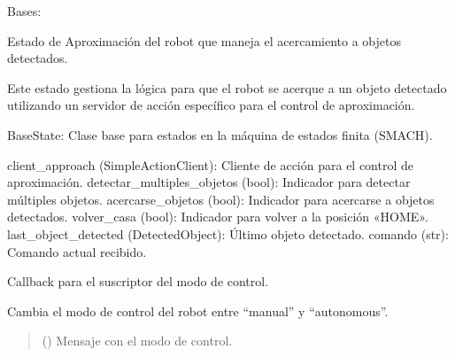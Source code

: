 \documentclass[a4paper,10pt,spanish]{sphinxmanual}
\begin{document}
\begin{fulllineitems}
\label{\detokenize{squad_state_manager:squad_state_manager.EstadoApproach}}
\pysigstartsignatures
{}
\pysigstopsignatures
\sphinxAtStartPar
Bases: {\hyperref[\detokenize{squad_state_manager:squad_state_manager.BaseState}]{}}

\sphinxAtStartPar
Estado de Aproximación del robot que maneja el acercamiento a objetos detectados.

\sphinxAtStartPar
Este estado gestiona la lógica para que el robot se acerque a un objeto detectado utilizando
un servidor de acción específico para el control de aproximación.
\begin{description}
\sphinxAtStartPar
BaseState: Clase base para estados en la máquina de estados finita (SMACH).

\sphinxAtStartPar
client\_approach (SimpleActionClient): Cliente de acción para el control de aproximación.
detectar\_multiples\_objetos (bool): Indicador para detectar múltiples objetos.
acercarse\_objetos (bool): Indicador para acercarse a objetos detectados.
volver\_casa (bool): Indicador para volver a la posición «HOME».
last\_object\_detected (DetectedObject): Último objeto detectado.
comando (str): Comando actual recibido.

\end{description}

\begin{fulllineitems}
\label{\detokenize{squad_state_manager:squad_state_manager.EstadoApproach.control_mode_callback}}
\pysigstartsignatures
{}
\pysigstopsignatures
\sphinxAtStartPar
Callback para el suscriptor del modo de control.

\sphinxAtStartPar
Cambia el modo de control del robot entre “manual” y “autonomous”.
\begin{quote}\begin{description}
\sphinxAtStartPar
{} () \textendash{} Mensaje con el modo de control.


\end{description}
\end{quote}
\end{fulllineitems}
\end{fulllineitems}
\end{document}
